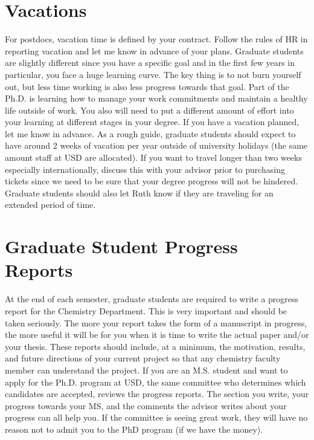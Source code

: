 \documentclass[letterpaper]{article}
\begin{document}
\section*{Vacations}
For postdocs, vacation time is defined by your contract. Follow the rules of HR in reporting vacation and let me know in advance of your plans. Graduate students are slightly different since you have a specific goal and in the first few years in particular, you face a huge learning curve. The key thing is to not burn yourself out, but less time working is also less progress towards that goal. Part of the Ph.D. is learning how to manage your work commitments and maintain a healthy life outside of work. You also will need to put a different amount of effort into your learning at different stages in your degree. If you have a vacation planned, let me know in advance. As a rough guide, graduate students should expect to have around 2 weeks of vacation per year outside of university holidays (the same amount staff at USD are allocated). If you want to travel longer than two weeks especially internationally, discuss this with your advisor prior to purchasing tickets since we need to be sure that your degree progress will not be hindered. Graduate students should also let Ruth know if they are traveling for an extended period of time.

\section*{Graduate Student Progress Reports}
At the end of each semester, graduate students are required to write a progress report for the Chemistry Department. This is very important and should be taken seriously. The more your report takes the form of a manuscript in progress, the more useful it will be for you when it is time to write the actual paper and/or your thesis. These reports should include, at a minimum, the motivation, results, and future directions of your current project so that any chemistry faculty member can understand the project. If you are an M.S. student and want to apply for the Ph.D. program at USD, the same committee who determines which candidates are accepted, reviews the progress reports. The section you write, your progress towards your MS, and the comments the advisor writes about your progress can all help you. If the committee is seeing great work, they will have no reason not to admit you to the PhD program (if we have the money).
\end{document}
